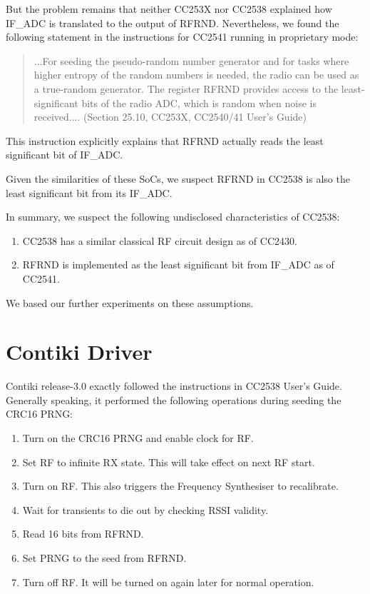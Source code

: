 But the problem remains that neither CC253X nor CC2538 explained how IF\_ADC is translated to the output of RFRND. Nevertheless, we found the following statement in the instructions for CC2541 running in proprietary mode:
\begin{quote}
...For seeding the pseudo-random number generator and for tasks where higher entropy of the random numbers is needed, the radio can be used as a true-random generator. The register RFRND provides access to the least-significant bits of the radio ADC, which is random when noise is received.... (Section 25.10, CC253X, CC2540/41 User's Guide)
\label{CC2540 RND}
\end{quote}

This instruction explicitly explains that RFRND actually reads the least significant bit of IF\_ADC.

Given the similarities of these SoCs, we suspect RFRND in CC2538 is also  the least significant bit from its IF\_ADC.

In summary, we suspect the following undisclosed characteristics of CC2538:
\begin{enumerate}
\item CC2538 has a similar classical RF circuit design as of CC2430.
\item RFRND is implemented as the least significant bit from IF\_ADC as of CC2541.
\end{enumerate}

We based our further experiments on these assumptions.

\section{Contiki Driver}

Contiki release-3.0 exactly followed the instructions in CC2538 User's Guide. Generally speaking, it performed the following operations during seeding the CRC16 PRNG:
\begin{enumerate}
\item Turn on the CRC16 PRNG and enable clock for RF.
\item Set RF to infinite RX state. This will take effect on next RF start.
\item Turn on RF. This also triggers the Frequency Synthesiser to recalibrate.
\item Wait for transients to die out by checking RSSI validity. 
\item Read 16 bits from RFRND.
\item Set PRNG to the seed from RFRND.
\item Turn off RF. It will be turned on again later for normal operation.
\end{enumerate}

